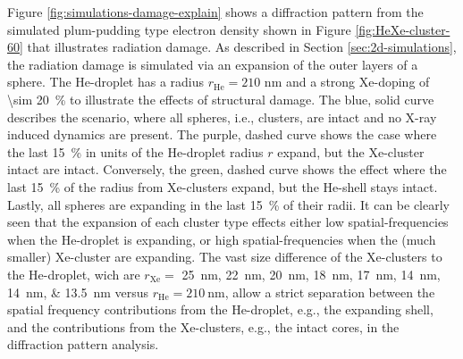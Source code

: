 Figure \ref{fig:simulations-damage-explain} shows a diffraction pattern from the simulated plum-pudding type electron density shown in Figure \ref{fig:HeXe-cluster-60} that illustrates radiation damage. As described in Section \ref{sec:2d-simulations}, the radiation damage is simulated via an expansion of the outer layers of a sphere. The He-droplet has a radius $r_{\text{He}}=210$ nm and a strong Xe-doping of \SI{\sim 20}{\percent} to illustrate the effects of structural damage. The blue, solid curve describes the scenario, where all spheres, i.e., clusters, are intact and no X-ray induced dynamics are present. The purple, dashed curve shows the case where the last \SI{15}{\percent} in units of the He-droplet radius $r$ expand, but the Xe-cluster intact are intact. Conversely, the green, dashed curve shows the effect where the last \SI{15}{\percent} of the radius from Xe-clusters expand, but the He-shell stays intact. Lastly, all spheres are expanding in the last \SI{15}{\percent} of their radii. It can be clearly seen that the expansion of each cluster type effects either low spatial-frequencies when the He-droplet is expanding, or high spatial-frequencies when the (much smaller) Xe-cluster are expanding. The vast size difference of the Xe-clusters to the He-droplet, wich are $r_{\text{Xe}}=$ \SIlist{25;22;20;18;17;14;14;13.5}{\nano\meter} versus $r_{\text{He}}=\SI{210}{\nano\meter}$, allow a strict separation between the spatial frequency contributions from the He-droplet, e.g., the expanding shell, and the contributions from the Xe-clusters, e.g., the intact cores, in the diffraction pattern analysis.\\[1\baselineskip]
